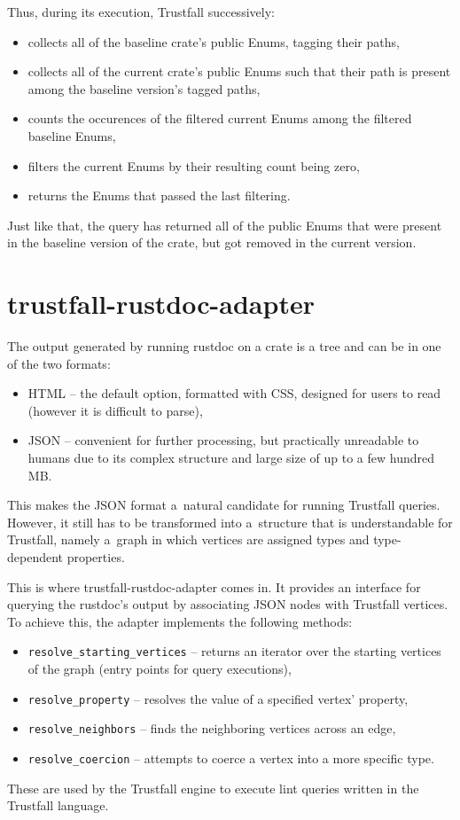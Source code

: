 \documentclass[licencjacka,en]{pracamgr}
\begin{document}
Thus, during its execution, Trustfall successively:
\begin{itemize}
	\item collects all of the baseline crate's public Enums, tagging their paths,
	\item collects all of the current crate's public Enums such that their path is present among
		the baseline version's tagged paths,
	\item counts the occurences of the filtered current Enums among the filtered baseline Enums,
	\item filters the current Enums by their resulting count being zero,
	\item returns the Enums that passed the last filtering.
\end{itemize}
Just like that, the query has returned all of the public Enums that were present in the baseline
version of the crate, but got removed in the current version.

\section{trustfall-rustdoc-adapter}
The output generated by running rustdoc on a crate is a tree and can be in one of the two formats:
\begin{itemize}
	\item HTML -- the default option, formatted with CSS, designed for users to read
		(however it is difficult to parse),
	\item JSON -- convenient for further processing, but practically unreadable to humans
		due to its complex structure and large size of up to a few hundred MB.
\end{itemize}
This makes the JSON format a~natural candidate for
running Trustfall queries. However, it still has to be transformed into a~structure that is
understandable for Trustfall, namely a~graph in which vertices are assigned types and
type-dependent properties.

This is where trustfall-rustdoc-adapter comes in. It provides an interface for querying the rustdoc's
output by associating JSON nodes with Trustfall vertices. To achieve this, the adapter implements
the following methods:
\begin{itemize}
	\item \texttt{resolve\_starting\_vertices} -- returns an iterator over the starting vertices of
		the graph (entry points for query executions),
	\item \texttt{resolve\_property} -- resolves the value of a specified vertex' property,
	\item \texttt{resolve\_neighbors} -- finds the neighboring vertices across an edge,
	\item \texttt{resolve\_coercion} -- attempts to coerce a vertex into a more specific type.
\end{itemize}
These are used by the Trustfall engine to execute lint queries written in the Trustfall language.
\end{document}
